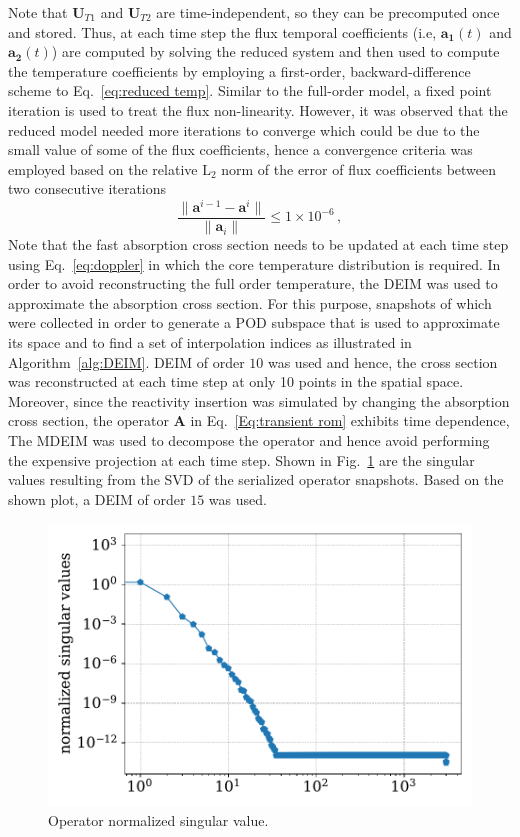 \documentclass[]{interact}
\theoremstyle{plain}%
\theoremstyle{definition}
\theoremstyle{remark}
\begin{document}
Note that $\mathbf{U}_{T1}$ and $\mathbf{U}_{T2}$ are time-independent, so they can be precomputed once and stored.
Thus, at each time step the flux temporal coefficients (i.e, $\mathbf{a_1}(t)$ and $\mathbf{a_2}(t)$) are computed by solving the reduced system and then used to compute the temperature coefficients by employing a first-order, backward-difference scheme to Eq.~\ref{eq:reduced temp}.
Similar to the full-order model, a fixed point iteration is used to treat the flux non-linearity.
However, it was observed that the reduced model needed more iterations to converge which could be due to the small value of some of the flux coefficients, hence a convergence criteria was employed based on the relative $\text{L}_2$ norm of the error of flux coefficients between two consecutive iterations 
\begin{equation}
\frac{\| \mathbf{a}^{i-1} - \mathbf{a}^{i}\|}{\|\mathbf{a}_i \|} \le 1\times 10^{-6}  \, , 
\end{equation}
Note that the fast absorption cross section needs to be updated at each time step using Eq.~\ref{eq:doppler} in which the core temperature distribution is required.
In order to avoid reconstructing the full order temperature, 
the DEIM was used to approximate the absorption cross section.
For this purpose, snapshots of which were collected in order to generate a POD subspace that is used to approximate its space and to find a set of interpolation indices as illustrated in Algorithm~\ref{alg:DEIM}.
DEIM of order $10$ was used and hence, the cross section was reconstructed at each time step at only 10 points in the spatial space.
Moreover, since the reactivity insertion was simulated by changing the absorption cross section, the operator $\mathbf{A}$ in Eq.~\ref{Eq:transient rom} exhibits time dependence, 
The MDEIM was used to decompose the operator and hence avoid performing the expensive projection at each time step.
Shown in Fig.~\ref{fig:lra L singular values} are the singular values resulting from the SVD of the serialized operator snapshots. 
Based on the shown plot, a DEIM of order $15$ was used.
\begin{figure}[H]
	\includegraphics[width=1.0\linewidth]{../figures/LRA_L_singular_values.pdf}
	\caption{Operator normalized singular value.}
	\label{fig:lra L singular values}
\end{figure}
\end{document}
